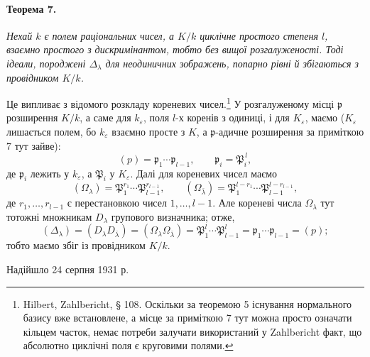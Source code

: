 \documentclass[11pt]{article}
\providecommand{\frakp}{\mathfrak{p}}
\begin{document}
\paragraph{Теорема 7.}
\emph{Нехай \(k\) є полем раціональних чисел, а \(K/k\) циклічне простого степеня \(l\), взаємно простого з дискримінантом, тобто без вищої розгалуженості. Тоді ідеали, породжені \(\Delta_\lambda\) для неодиничних зображень, попарно рівні й збігаються з провідником \(K/k\).}

Це випливає з відомого розкладу кореневих чисел.\footnote{Hilbert, Zahlbericht, § 108. Оскільки за теоремою 5 існування нормального базису вже встановлене, а місце за приміткою 7 тут можна просто означати кільцем часток, немає потреби залучати використаний у Zahlbericht факт, що абсолютно циклічні поля є круговими полями.} У розгалуженому місці \(\frakp\) розширення \(K/k\), а саме для \(k_\varepsilon\), поля \(l\)-х коренів з одиниці, і для \(K_\varepsilon\), маємо (\(K_\varepsilon\) лишається полем, бо \(k_\varepsilon\) взаємно просте з \(K\), а \(\frakp\)-адичне розширення за приміткою 7 тут зайве):
\[
        (p)=\frakp_1\cdots\frakp_{l-1},
        \qquad
        \frakp_i=\mathfrak P_i^{\,l},
\]
де \(\frakp_i\) лежить у \(k_\varepsilon\), а \(\mathfrak P_i\) у \(K_\varepsilon\). Далі для кореневих чисел маємо
\[
        (\Omega_\lambda)=\mathfrak P_1^{r_1}\cdots\mathfrak P_{l-1}^{r_{l-1}},
        \qquad
        (\Omega_{\bar\lambda})=
        \mathfrak P_1^{l-r_1}\cdots \mathfrak P_{l-1}^{l-r_{l-1}},
\]
де \(r_1,\ldots,r_{l-1}\) є перестановкою чисел \(1,\ldots,l-1\). Але кореневі числа \(\Omega_\lambda\) тут тотожні множникам \(D_\lambda\) групового визначника; отже,
\[
        (\Delta_\lambda)=(D_\lambda D_{\bar\lambda})
        =(\Omega_\lambda\Omega_{\bar\lambda})
        =\mathfrak P_1^{l}\cdots\mathfrak P_{l-1}^{l}
        =\frakp_1\cdots\frakp_{l-1}=(p);
\]
тобто маємо збіг із провідником \(K/k\).

\begin{center}
Надійшло 24 серпня 1931 р.
\end{center}
\end{document}
